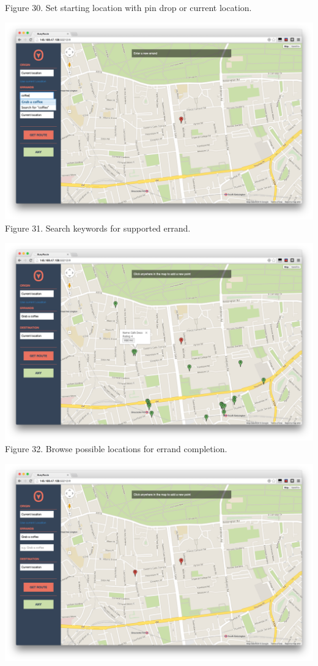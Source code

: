 \documentclass[a4paper, 10pt]{report}
\begin{document}
\begin{appendices}
\begin{center}
Figure 30. Set starting location with pin drop or current location.
\end{center}
\begin{center}
\includegraphics[scale=0.18]{um-04-search-errand.png}\\
Figure 31. Search keywords for supported errand.
\end{center}
\begin{center}
\includegraphics[scale=0.18]{um-05-place-detail.png}\\
Figure 32. Browse possible locations for errand completion.
\end{center}
\begin{center}
\includegraphics[scale=0.18]{um-06-place-select.png}\\

\end{center}
\end{appendices}
\end{document}
